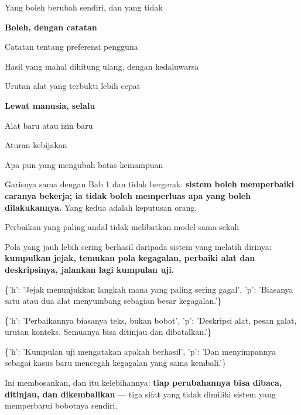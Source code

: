 \documentclass[aspectratio=169,11pt,t]{beamer}
\begin{document}
\begin{frame}[shrink=25]{Yang boleh berubah sendiri, dan yang tidak}
\begin{minipage}[t]{0.485\textwidth}
{\fontsize{9.4}{12.6}\selectfont\color{fg2}\textbf{Boleh, dengan catatan}\par}\vskip 4pt
\begin{ibullets}
\item Catatan tentang preferensi pengguna
\item Hasil yang mahal dihitung ulang, dengan kedaluwarsa
\item Urutan alat yang terbukti lebih cepat
\end{ibullets}

\end{minipage}%
\hfill
\begin{minipage}[t]{0.485\textwidth}
{\fontsize{9.4}{12.6}\selectfont\color{fg2}\textbf{Lewat manusia, selalu}\par}\vskip 4pt
\begin{ibullets}
\item Alat baru atau izin baru
\item Aturan kebijakan
\item Apa pun yang mengubah batas kemampuan
\end{ibullets}

\end{minipage}%
\begin{iband}[signal]
Garisnya sama dengan Bab 1 dan tidak bergerak: \textbf{sistem boleh memperbaiki caranya bekerja; ia tidak boleh memperluas apa yang boleh dilakukannya.} Yang kedua adalah keputusan orang.
\end{iband}
\end{frame}

\begin{frame}[shrink=25]{Perbaikan yang paling andal tidak melibatkan model sama sekali}
{\fontsize{9.4}{12.6}\selectfont\color{fg2}Pola yang jauh lebih sering berhasil daripada sistem yang melatih dirinya: \textbf{kumpulkan jejak, temukan pola kegagalan, perbaiki alat dan deskripsinya, jalankan lagi kumpulan uji.}\par}\vskip 4pt
\begin{isteps}
\item \{'h': 'Jejak menunjukkan langkah mana yang paling sering gagal', 'p': 'Biasanya satu atau dua alat menyumbang sebagian besar kegagalan.'\}
\item \{'h': 'Perbaikannya biasanya teks, bukan bobot', 'p': 'Deskripsi alat, pesan galat, urutan konteks. Semuanya bisa ditinjau dan dibatalkan.'\}
\item \{'h': 'Kumpulan uji mengatakan apakah berhasil', 'p': 'Dan menyimpannya sebagai kasus baru mencegah kegagalan yang sama kembali.'\}
\end{isteps}
\begin{iband}[signal]
Ini membosankan, dan itu kelebihannya: \textbf{tiap perubahannya bisa dibaca, ditinjau, dan dikembalikan} --- tiga sifat yang tidak dimiliki sistem yang memperbarui bobotnya sendiri.
\end{iband}
\end{frame}
\end{document}
